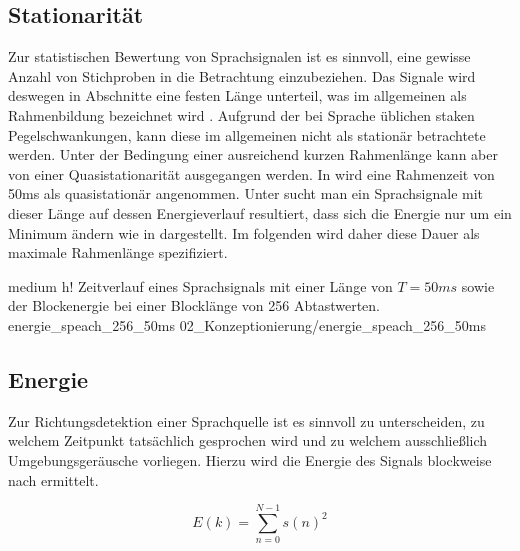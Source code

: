 \subsection{Stationarität}
\label{subsec:Stationaritaet}
Zur statistischen Bewertung von Sprachsignalen ist es sinnvoll, eine gewisse Anzahl von Stichproben in die Betrachtung einzubeziehen. Das Signale wird deswegen in Abschnitte eine festen Länge unterteil, was im allgemeinen als Rahmenbildung bezeichnet wird \cite[S 23]{Master_Array_Pikora}. Aufgrund der bei Sprache üblichen staken Pegelschwankungen, kann diese im allgemeinen nicht als stationär betrachtete werden. Unter der Bedingung einer ausreichend kurzen Rahmenlänge kann aber von einer Quasistationarität ausgegangen werden. In \citet{Master_Array_Pikora} wird eine Rahmenzeit von 50ms als quasistationär angenommen. Unter sucht man ein Sprachsignale mit dieser Länge auf dessen Energieverlauf resultiert, dass sich die Energie nur um ein Minimum ändern wie in  dargestellt. Im folgenden wird daher diese Dauer als maximale Rahmenlänge spezifiziert.



         {medium}                 %
         {h!}             %
         {Zeitverlauf eines Sprachsignals mit einer Länge von $T = 50ms$ sowie der Blockenergie bei einer Blocklänge von 256 Abtastwerten.}                %
         {energie_speach_256_50ms}                %
         {02_Konzeptionierung/energie_speach_256_50ms}     %


\subsection{Energie}
Zur Richtungsdetektion einer Sprachquelle ist es sinnvoll zu unterscheiden, zu welchem Zeitpunkt tatsächlich gesprochen wird und zu welchem ausschließlich Umgebungsgeräusche vorliegen. Hierzu wird die Energie des Signals blockweise nach  ermittelt.

\begin{equation}\label{eq:energie}
    E(k) = \sum_{n=0}^{N-1} s(n)^2
\end{equation}

